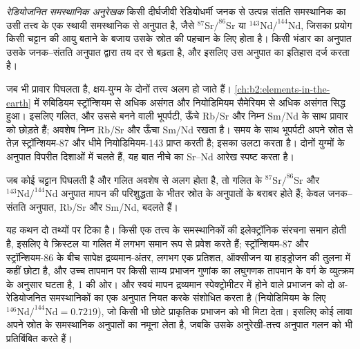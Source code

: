 \begin{definition}[रेडियोजनित समस्थानिक अनुरेखक]\label{def:b2:isotope-geochemistry:tracer}
\emph{रेडियोजनित समस्थानिक अनुरेखक} किसी
दीर्घजीवी रेडियोधर्मी जनक से उत्पन्न संतति समस्थानिक का उसी तत्त्व के एक स्थायी
समस्थानिक से अनुपात है, जैसे $^{87}\mathrm{Sr}/^{86}\mathrm{Sr}$ या
$^{143}\mathrm{Nd}/^{144}\mathrm{Nd}$, जिसका प्रयोग किसी चट्टान की आयु बताने के बजाय
उसके स्रोत की पहचान के लिए होता है। किसी भंडार का अनुपात उसके
जनक--संतति अनुपात द्वारा तय दर से बढ़ता है, और इसलिए उस अनुपात का इतिहास दर्ज करता है।
\end{definition}

जब भी प्रावार पिघलता है, क्षय-युग्म के दोनों तत्त्व अलग हो जाते हैं।
\cref{ch:b2:elements-in-the-earth} में रुबिडियम स्ट्रॉन्शियम से अधिक असंगत
और नियोडिमियम सैमेरियम से अधिक असंगत सिद्ध हुआ। इसलिए गलित, और उससे बनने वाली भूपर्पटी,
ऊँचे Rb/Sr और निम्न Sm/Nd के साथ प्रावार को छोड़ते हैं; अवशेष
निम्न Rb/Sr और ऊँचा Sm/Nd रखता है। समय के साथ भूपर्पटी अपने स्रोत से तेज़
स्ट्रॉन्शियम-87 और धीमे नियोडिमियम-143 प्राप्त करती है;  इसका उलटा करता है। दोनों युग्मों के अनुपात विपरीत
दिशाओं में चलते हैं, यह बात नीचे का Sr--Nd आरेख स्पष्ट करता है।

\begin{proposition}\label{prop:b2:isotope-geochemistry:melting}
जब कोई चट्टान पिघलती है और गलित अवशेष से अलग होता है, तो गलित के
$^{87}\mathrm{Sr}/^{86}\mathrm{Sr}$ और $^{143}\mathrm{Nd}/^{144}\mathrm{Nd}$ अनुपात
मापन की परिशुद्धता के भीतर स्रोत के अनुपातों के बराबर होते हैं;
केवल जनक--संतति अनुपात, Rb/Sr और Sm/Nd, बदलते हैं।
\end{proposition}
\admitted

\noindent यह कथन दो तथ्यों पर टिका है। किसी एक तत्त्व के समस्थानिकों की
इलेक्ट्रॉनिक संरचना समान होती है, इसलिए वे क्रिस्टल या गलित में लगभग समान रूप से प्रवेश करते हैं;
स्ट्रॉन्शियम-87 और स्ट्रॉन्शियम-86 के बीच सापेक्ष द्रव्यमान-अंतर, लगभग एक
प्रतिशत, ऑक्सीजन या हाइड्रोजन की तुलना में कहीं छोटा है, और उच्च तापमान पर
किसी साम्य प्रभाजन गुणांक का लघुगणक तापमान के वर्ग के व्युत्क्रम के अनुसार
घटता है, 1 की ओर। और स्वयं मापन द्रव्यमान स्पेक्ट्रोमीटर में होने वाले
प्रभाजन को दो अ-रेडियोजनित समस्थानिकों का एक अनुपात नियत करके संशोधित करता है
(नियोडिमियम के लिए $^{146}\mathrm{Nd}/^{144}\mathrm{Nd} =
0.7219$), जो किसी भी छोटे प्राकृतिक प्रभाजन को भी मिटा देता। इसलिए कोई लावा
अपने स्रोत के समस्थानिक अनुपातों का नमूना लेता है, जबकि उसके अनुरेखी-तत्त्व
अनुपात गलन को भी प्रतिबिंबित करते हैं।

